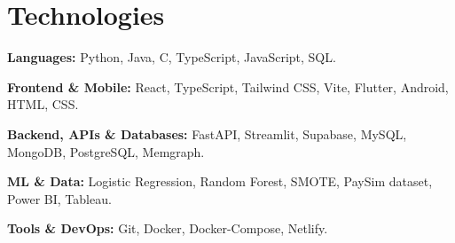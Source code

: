     \section{Technologies}
        \begin{onecolentry}
            \textbf{Languages:} Python, Java, C, TypeScript, JavaScript, SQL.
        \end{onecolentry}
        \vspace{0.1 cm}
        \begin{onecolentry}
            \textbf{Frontend \& Mobile:} React, TypeScript, Tailwind CSS, Vite, Flutter, Android, HTML, CSS.
        \end{onecolentry}
        \vspace{0.1 cm}
        \begin{onecolentry}
            \textbf{Backend, APIs \& Databases:} FastAPI, Streamlit, Supabase, MySQL, MongoDB, PostgreSQL, Memgraph.
        \end{onecolentry}
        \vspace{0.1 cm}
        \begin{onecolentry}
            \textbf{ML \& Data:} Logistic Regression, Random Forest, SMOTE, PaySim dataset, Power BI, Tableau.
        \end{onecolentry}
        \vspace{0.1 cm}
        \begin{onecolentry}
            \textbf{Tools \& DevOps:} Git, Docker, Docker-Compose, Netlify.
        \end{onecolentry}
